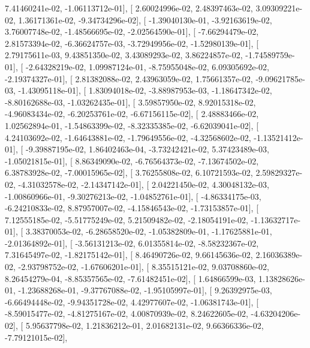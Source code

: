 \documentclass{article}
\begin{document}
          7.41460241e-02,  -1.06113712e-01],
       [  2.60024996e-02,   2.48397463e-02,   3.09309221e-02,
          1.36171361e-02,  -9.34734296e-02],
       [ -1.39040130e-01,  -3.92163619e-02,   3.76007748e-02,
         -1.48566695e-02,  -2.02564590e-01],
       [ -7.66294479e-02,   2.81573394e-02,  -6.36624757e-03,
         -3.72949956e-02,  -1.52980139e-01],
       [  2.79175611e-03,   9.43851350e-02,   3.43089293e-02,
          3.86224857e-02,  -1.74589759e-01],
       [ -2.64328219e-02,   1.09987124e-01,  -8.75955048e-02,
          6.09305692e-02,  -2.19374327e-01],
       [  2.81382088e-02,   2.43963059e-02,   1.75661357e-02,
         -9.09621785e-03,  -1.43095118e-01],
       [  1.83094018e-02,  -3.88987953e-03,  -1.18647342e-02,
         -8.80162688e-03,  -1.03262435e-01],
       [  3.59857950e-02,   8.92015318e-02,  -4.96083434e-02,
         -6.20253761e-02,  -6.67156115e-02],
       [  2.48883466e-02,   1.02562894e-01,  -1.54863399e-02,
         -8.32335385e-02,  -6.62039041e-02],
       [  4.24103692e-02,  -1.64643881e-02,  -1.79649556e-02,
         -4.32568602e-02,  -1.13521412e-01],
       [ -9.39887195e-02,   1.86402463e-04,  -3.73242421e-02,
          5.37423489e-03,  -1.05021815e-01],
       [  8.86349090e-02,  -6.76564373e-02,  -7.13674502e-02,
          6.38783928e-02,  -7.00015965e-02],
       [  3.76255808e-02,   6.10721593e-02,   2.59829327e-02,
         -4.31032578e-02,  -2.14347142e-01],
       [  2.04221450e-02,   4.30048132e-03,  -1.00860966e-01,
         -9.30276213e-02,  -1.04852761e-01],
       [ -4.86334175e-03,  -6.24210833e-02,   8.87957007e-02,
         -4.15846543e-02,  -1.73153857e-01],
       [  7.12555185e-02,  -5.51775249e-02,   5.21509482e-02,
         -2.18054191e-02,  -1.13632717e-01],
       [  3.38370053e-02,  -6.28658520e-02,  -1.05382809e-01,
         -1.17625881e-01,  -2.01364892e-01],
       [ -3.56131213e-02,   6.01355814e-02,  -8.58232367e-02,
          7.31645497e-02,  -1.82175142e-01],
       [  8.46490726e-02,   9.66145636e-02,   2.16036389e-02,
         -2.93798752e-02,  -1.67606201e-01],
       [  8.35515121e-02,   9.03708860e-02,   8.26454279e-04,
         -8.85357565e-02,  -7.61482451e-02],
       [  1.64866599e-03,   1.13828626e-01,  -1.23688268e-01,
         -9.37767088e-02,  -1.95105997e-01],
       [  9.26392975e-03,  -6.66494448e-02,  -9.94351728e-02,
          4.42977607e-02,  -1.06381743e-01],
       [ -8.59015477e-02,  -4.81275167e-02,   4.00870939e-02,
          8.24622605e-02,  -4.63204206e-02],
       [  5.95637798e-02,   1.21836212e-01,   2.01682131e-02,
          9.66366336e-02,  -7.79121015e-02],
\end{document}
